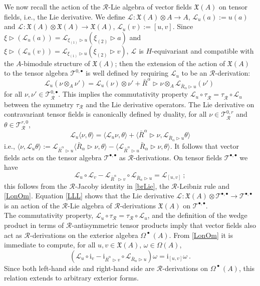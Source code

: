 \documentclass[12pt]{article}
\numberwithin{equation}{section}
\theoremstyle{plain}
\theoremstyle{definition}
\theoremstyle{remark}
\def\Vect{\mathfrak{X}}
\def\VV{\Vect(A)}
\def\ra{\triangleright}
\def\LLL{\mathscr{L}^{\mathcal{}}}
\def\LL{\mathscr{L}^{\mathcal{}}}
\def\RR{\mathcal{R}}
\def\Tau{\mathcal T}
\def\ii{\mathrm{i}}
\def\oR{\bar R}
\def\al{\alpha}
\def\OM{{\Omega^{\!\!\;\bullet}\!\!\:(A)}}
\begin{document}
We now recall the action of the ${\mathcal{R}}$-Lie algebra of vector fields
$\Vect(A)$ on tensor fields, i.e.,  the Lie derivative. We define $\LLL:\VV\otimes A\to A$, $\LLL_u(a):=u(a)$ 
and  $\LLL:\VV\otimes \VV\to \VV$, $\LLL_u(v):=[u,v]$. 
Since $\xi\ra (\LLL_u(a))=\LLL_{\xi_{(1)}\ra u}(\xi_{(2)}\ra a)$ and
$\xi\ra (\LLL_u(v))=\LLL_{\xi_{(1)}\ra u}(\xi_{(2)}\ra v)$, $\LLL$ is $H$-equivariant 
and compatible with the $A$-bimodule structure of $\VV$; then the extension of the action of $\Vect(A)$ to the tensor
algebra $\Tau^{0,\bullet}$ is well defined
by requiring $\LLL_u$ to be an  ${\mathcal{R}}$-derivation:
$$\LLL_u(\nu\otimes_A\nu')=\LLL_u(\nu)\otimes
\nu'+\oR^\al\ra \nu\otimes_A\LLL_{\oR_\al\ra u}(\nu')~$$
for all $\nu,\nu'\in  \Tau_\RR^{0,\bullet}$. This implies the
commutativity property $\LL_u\circ
\tau^{}_{{\mathcal{R}}}=\tau^{}_{{\mathcal{R}}}\circ\LL_u$ between the  symmetry $\tau_{{\mathcal{R}}}$ and the Lie derivative
operators.
The Lie derivative on contravariant tensor fields
is canonically defined by duality, for all $\nu\in \Tau_\RR^{0,r}$ and
$\theta\in  \Tau_\RR^{r,0}$,
\begin{equation}\label{LonOm} \LLL_u\langle \nu,\theta\rangle=\langle\LLL_u\nu,\theta\rangle
+\langle \oR^\al\ra\nu,\LLL_{\oR_\al\ra u}\theta\rangle
\end{equation} 
i.e., $\langle \nu,\LLL_{u}\theta\rangle:=\LLL_{\oR^\al \ra u}\langle \oR_\al\ra
\nu,\theta\rangle-\langle\LLL_{\oR^\al\ra u}\oR_\al \ra\nu,\theta\rangle
$.
It follows that vector fields acts on the tensor algebra
$\Tau^{\bullet,\bullet}$ as  ${\mathcal{R}}$-derivations. 
On tensor fields  $\Tau^{\bullet,\bullet}$ we have 
\begin{equation}\label{LLL}
\LLL_u\circ \LLL_v-\LLL_{\oR^\al \ra v}\circ \LLL_{\oR_\al \ra
  u}=\LLL_{[u,v]}~;
\end{equation}
this follows from the  ${\mathcal{R}}$-Jacoby identity in \eqref{brLie}, the
 ${\mathcal{R}}$-Leibniz rule and \eqref{LonOm}. Equation \eqref{LLL} shows
that the Lie derivative $\LLL:\VV\otimes\Tau^{\bullet,\bullet}\to  \Tau^{\bullet,\bullet}$ 
is an action of the ${\mathcal{R}}$-Lie algebra of ${\mathcal{R}}$-derivations $\VV$ on  $\Tau^{\bullet,\bullet}$. 
\\



The commutativity property,
$\LLL_u\circ\tau_{{\mathcal{R}}}=\tau_{{\mathcal{R}}}\circ\LLL_u$, and the definition of the 
wedge product in terms of  ${\mathcal{R}}$-antisymmetric tensor products imply that vector fields  also act as  ${\mathcal{R}}$-derivations on the exterior algebra
$\OM$. 
From \eqref{LonOm} it is immediate to compute, for all $u,v\in
\Vect(A)$, $\omega\in \Omega(A)$, 
\begin{equation}\label{Lii}
(\LLL_u\circ \ii_v-\ii_{\oR^\al \ra v}\circ \LLL_{\oR_\al \ra
  u})\omega=\ii_{[u,v]}\omega~.
\end{equation}
Since both left-hand side and right-hand side are  ${\mathcal{R}}$-derivations
on $\OM$, this relation extends to arbitrary exterior forms.
\\
\end{document}
